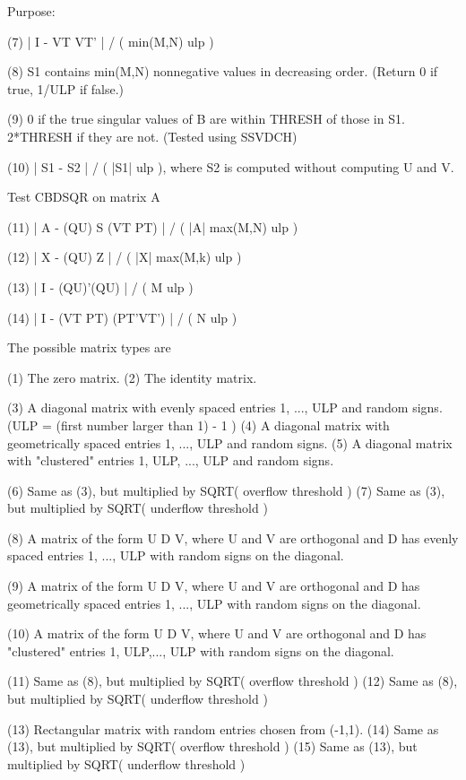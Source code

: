 \begin{DoxyParagraph}{Purpose\+: }
\begin{DoxyVerb}
 (7)   | I - VT VT' | / ( min(M,N) ulp )

 (8)   S1 contains min(M,N) nonnegative values in decreasing order.
       (Return 0 if true, 1/ULP if false.)

 (9)   0 if the true singular values of B are within THRESH of
       those in S1.  2*THRESH if they are not.  (Tested using
       SSVDCH)

 (10)  | S1 - S2 | / ( |S1| ulp ), where S2 is computed without
                                   computing U and V.

 Test CBDSQR on matrix A

 (11)  | A - (QU) S (VT PT) | / ( |A| max(M,N) ulp )

 (12)  | X - (QU) Z | / ( |X| max(M,k) ulp )

 (13)  | I - (QU)'(QU) | / ( M ulp )

 (14)  | I - (VT PT) (PT'VT') | / ( N ulp )

 The possible matrix types are

 (1)  The zero matrix.
 (2)  The identity matrix.

 (3)  A diagonal matrix with evenly spaced entries
      1, ..., ULP  and random signs.
      (ULP = (first number larger than 1) - 1 )
 (4)  A diagonal matrix with geometrically spaced entries
      1, ..., ULP  and random signs.
 (5)  A diagonal matrix with "clustered" entries 1, ULP, ..., ULP
      and random signs.

 (6)  Same as (3), but multiplied by SQRT( overflow threshold )
 (7)  Same as (3), but multiplied by SQRT( underflow threshold )

 (8)  A matrix of the form  U D V, where U and V are orthogonal and
      D has evenly spaced entries 1, ..., ULP with random signs
      on the diagonal.

 (9)  A matrix of the form  U D V, where U and V are orthogonal and
      D has geometrically spaced entries 1, ..., ULP with random
      signs on the diagonal.

 (10) A matrix of the form  U D V, where U and V are orthogonal and
      D has "clustered" entries 1, ULP,..., ULP with random
      signs on the diagonal.

 (11) Same as (8), but multiplied by SQRT( overflow threshold )
 (12) Same as (8), but multiplied by SQRT( underflow threshold )

 (13) Rectangular matrix with random entries chosen from (-1,1).
 (14) Same as (13), but multiplied by SQRT( overflow threshold )
 (15) Same as (13), but multiplied by SQRT( underflow threshold )


\end{DoxyVerb}
\end{DoxyParagraph}
